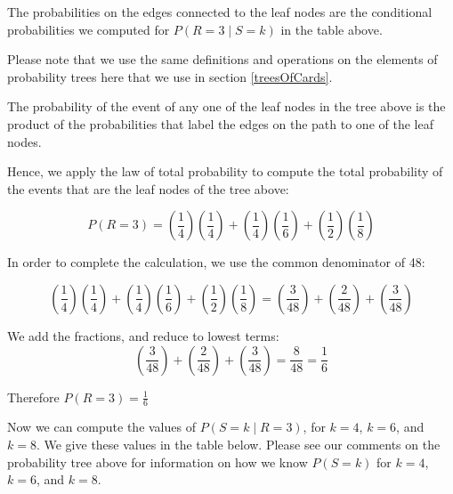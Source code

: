 \documentclass[a4paper,11pt]{article}
\begin{document}
The probabilities on the edges connected to the leaf nodes are the 
conditional probabilities we computed for 
$P \left( R=3 \mid S=k \right)$ in the table above.

Please note that we use the same definitions and operations on the 
elements of probability trees here that we use in section 
\ref{treesOfCards}.

The probability of the event of any one of the leaf nodes in the tree
above is the product of the probabilities that label the edges on the
path to one of the leaf nodes.

Hence, we apply the law of total probability to compute the total probability
of the events that are the leaf nodes of the tree above:

\begin{equation}
P \left( R=3 \right) = 
  \left( \frac{1}{4} \right) \left( \frac{1}{4} \right) +
  \left( \frac{1}{4} \right) \left( \frac{1}{6} \right) +
  \left( \frac{1}{2} \right) \left( \frac{1}{8} \right)
\end{equation}

In order to complete the calculation, we use the common denominator
of 48:

\begin{equation} 
  \left( \frac{1}{4} \right) \left( \frac{1}{4} \right) +
  \left( \frac{1}{4} \right) \left( \frac{1}{6} \right) +
  \left( \frac{1}{2} \right) \left( \frac{1}{8} \right)
= 
  \left( \frac{3}{48} \right) +
  \left( \frac{2}{48} \right) +
  \left( \frac{3}{48} \right)
\end{equation}

We add the fractions, and reduce to lowest terms:
\begin{equation} 
  \left( \frac{3}{48} \right) +
  \left( \frac{2}{48} \right) +
  \left( \frac{3}{48} \right)
= \frac{8}{48} = \frac{1}{6}
\end{equation}

Therefore $P \left(R = 3 \right) = \frac{1}{6}$

Now we can compute the values of $P \left( S = k \mid R = 3\right)$, for
$k=4$, $k=6$, and $k=8$. We give these values in the table below.
Please see our comments on the probability tree above for information on
how we know $P\left(S=k \right)$ for $k=4$, $k=6$, and $k=8$.
\end{document}
